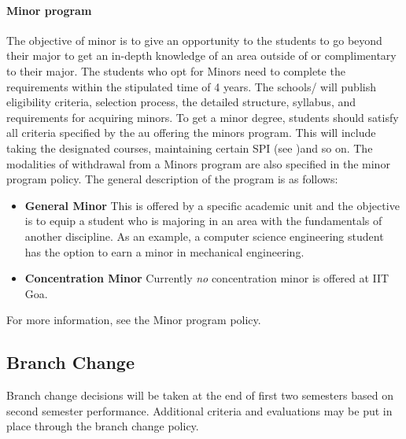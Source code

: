 \paragraph{Minor program} The objective of minor is to give an opportunity to the \glspl{student} to go beyond their major to get an in-depth knowledge of an area outside of or complimentary to their major. The students who opt for Minors need to complete the requirements within the stipulated time of 4 years. The \glspl{school}/  will publish eligibility criteria, selection process, the detailed structure, syllabus, and requirements for acquiring minors. To get a minor degree, students should satisfy all criteria specified by the \acrshort{au} offering the minors program. This will include taking the designated courses, maintaining certain SPI (see )and so on. The modalities of withdrawal from a Minors program are also specified in the minor program policy. The general description of the program is as follows: 

\begin{itemize}[leftmargin=15mm]
	\item \textbf{General Minor} This is offered by a specific academic unit and the objective is to equip a student who is majoring in an area with the fundamentals of another discipline. As an example, a computer science engineering student has the option to earn a minor in mechanical engineering.
	\item \textbf{Concentration Minor} Currently \textit{no} concentration minor is offered at IIT Goa.
\end{itemize}

For more information, see the Minor program policy.

\subsection{Branch Change}

Branch change decisions will be taken at the end of first two semesters based on second semester performance. Additional criteria and evaluations may be put in place through the branch change policy.